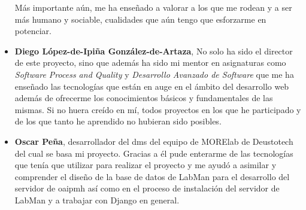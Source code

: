 \begin{itemize}
	Más importante aún, me ha enseñado a valorar a los que me rodean y a ser más humano y sociable, cualidades que aún tengo que esforzarme en potenciar.

	\item \textbf{Diego López-de-Ipiña González-de-Artaza}, No solo ha sido el director de este proyecto, sino que además ha sido mi mentor en asignaturas como \textit{Software Process and Quality} y \textit{Desarrollo Avanzado de Software} que me ha enseñado las tecnologías que están en auge en el ámbito del desarrollo web además de ofrecerme los conocimientos básicos y fundamentales de las mismas. Si no huera creído en mí, todos proyectos en los que he participado y de los que tanto he aprendido no hubieran sido posibles.

	\item \textbf{Oscar Peña}, desarrollador del \acrshort{dms} del equipo de MORElab de Deustotech del cual se basa mi proyecto. Gracias a él pude enterarme de las tecnologías que tenía que utilizar para realizar el proyecto y me ayudó a asimilar y comprender el diseño de la base de datos de LabMan para el desarrollo del servidor de \acrshort{oaipmh} así como en el proceso de instalación del servidor de LabMan y a trabajar con Django en general.

\end{itemize}